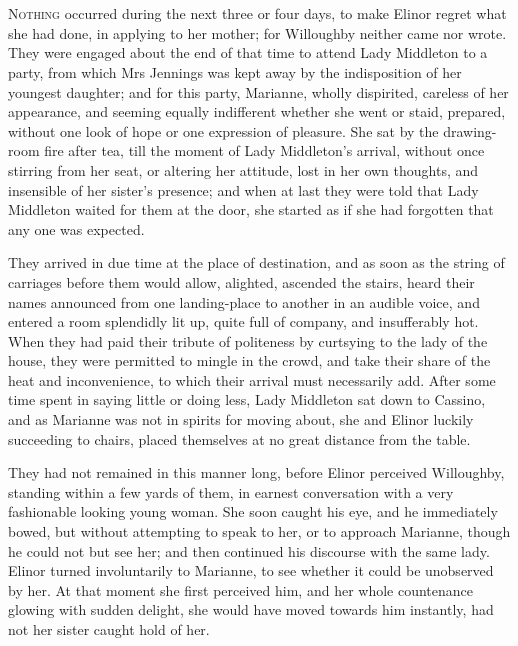 \chapter[Chapter \thechapter]{}
\lettrine[lines=4,lraise=0.3]{N}{othing} occurred during the next three or four days, to make Elinor regret what she had done, in applying to her mother; for Willoughby neither came nor wrote. They were engaged about the end of that time to attend Lady Middleton to a party, from which Mrs Jennings was kept away by the indisposition of her youngest daughter; and for this party, Marianne, wholly dispirited, careless of her appearance, and seeming equally indifferent whether she went or staid, prepared, without one look of hope or one expression of pleasure. She sat by the drawing-room fire after tea, till the moment of Lady Middleton’s arrival, without once stirring from her seat, or altering her attitude, lost in her own thoughts, and insensible of her sister’s presence; and when at last they were told that Lady Middleton waited for them at the door, she started as if she had forgotten that any one was expected.

They arrived in due time at the place of destination, and as soon as the string of carriages before them would allow, alighted, ascended the stairs, heard their names announced from one landing-place to another in an audible voice, and entered a room splendidly lit up, quite full of company, and insufferably hot. When they had paid their tribute of politeness by curtsying to the lady of the house, they were permitted to mingle in the crowd, and take their share of the heat and inconvenience, to which their arrival must necessarily add. After some time spent in saying little or doing less, Lady Middleton sat down to Cassino, and as Marianne was not in spirits for moving about, she and Elinor luckily succeeding to chairs, placed themselves at no great distance from the table.

They had not remained in this manner long, before Elinor perceived Willoughby, standing within a few yards of them, in earnest conversation with a very fashionable looking young woman. She soon caught his eye, and he immediately bowed, but without attempting to speak to her, or to approach Marianne, though he could not but see her; and then continued his discourse with the same lady. Elinor turned involuntarily to Marianne, to see whether it could be unobserved by her. At that moment she first perceived him, and her whole countenance glowing with sudden delight, she would have moved towards him instantly, had not her sister caught hold of her.



